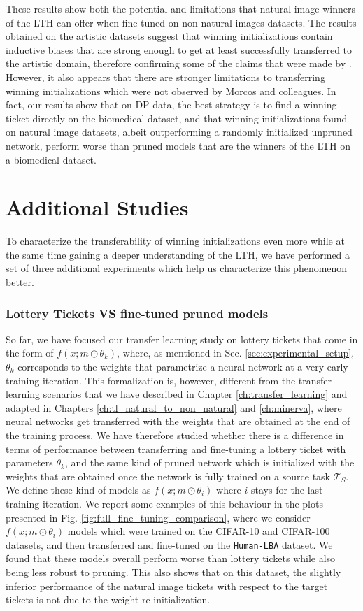 These results show both the potential and limitations that natural image winners of the LTH can offer when fine-tuned on non-natural images datasets. The results obtained on the artistic datasets suggest that winning initializations contain inductive biases that are strong enough to get at least successfully transferred to the artistic domain, therefore confirming some of the claims that were made by \citet{morcos2019one}. However, it also appears that there are stronger limitations to transferring winning initializations which were not observed by Morcos and colleagues. In fact, our results show that on DP data, the best strategy is to find a winning ticket directly on the biomedical dataset, and that winning initializations found on natural image datasets, albeit outperforming a randomly initialized unpruned network, perform worse than pruned models that are the winners of the LTH on a biomedical dataset.

\section{Additional Studies}
\label{sec:additional_studies}
To characterize the transferability of winning initializations even more while at the same time gaining a deeper understanding of the LTH, we have performed a set of three additional experiments which help us characterize this phenomenon better. 

\subsubsection{Lottery Tickets VS fine-tuned pruned models}
So far, we have focused our transfer learning study on lottery tickets that come in the form of $f(x;m\odot\theta_k)$, where, as mentioned in Sec. \ref{sec:experimental_setup}, $\theta_k$ corresponds to the weights that parametrize a neural network at a very early training iteration. This formalization is, however, different from the transfer learning scenarios that we have described in Chapter \ref{ch:transfer_learning} and adapted in Chapters \ref{ch:tl_natural_to_non_natural} and \ref{ch:minerva}, where neural networks get transferred with the weights that are obtained at the end of the training process. We have therefore studied whether there is a difference in terms of performance between transferring and fine-tuning a lottery ticket with parameters $\theta_k$, and the same kind of pruned network which is initialized with the weights that are obtained once the network is fully trained on a source task $\mathcal{T}_S$. We define these kind of models as $f(x;m\odot\theta_i)$ where $i$ stays for the last training iteration. We report some examples of this behaviour in the plots presented in Fig. \ref{fig:full_fine_tuning_comparison}, where we consider $f(x;m\odot\theta_i)$ models which were trained on the CIFAR-10 and CIFAR-100 datasets, and then transferred and fine-tuned on the \texttt{Human-LBA} dataset. We found that these models overall perform worse than lottery tickets while also being less robust to pruning. This also shows that on this dataset, the slightly inferior performance of the natural image tickets with respect to the target tickets is not due to the weight re-initialization.

